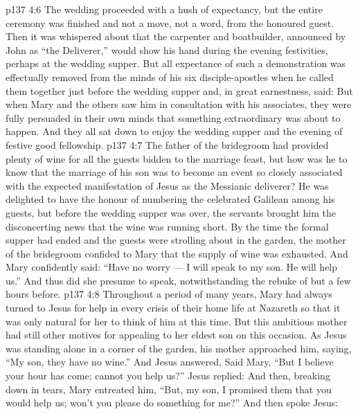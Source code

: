 \vs p137 4:6 \pc The wedding proceeded with a hush of expectancy, but the entire ceremony was finished and not a move, not a word, from the honoured guest. Then it was whispered about that the carpenter and boatbuilder, announced by John as “the Deliverer,” would show his hand during the evening festivities, perhaps at the wedding supper. But all expectance of such a demonstration was effectually removed from the minds of his six disciple\hyp{}apostles when he called them together just before the wedding supper and, in great earnestness, said:  But when Mary and the others saw him in consultation with his associates, they were fully persuaded in their own minds that something extraordinary was about to happen. And they all sat down to enjoy the wedding supper and the evening of festive good fellowship.
\vs p137 4:7 \pc The father of the bridegroom had provided plenty of wine for all the guests bidden to the marriage feast, but how was he to know that the marriage of his son was to become an event so closely associated with the expected manifestation of Jesus as the Messianic deliverer? He was delighted to have the honour of numbering the celebrated Galilean among his guests, but before the wedding supper was over, the servants brought him the disconcerting news that the wine was running short. By the time the formal supper had ended and the guests were strolling about in the garden, the mother of the bridegroom confided to Mary that the supply of wine was exhausted. And Mary confidently said: “Have no worry --- I will speak to my son. He will help us.” And thus did she presume to speak, notwithstanding the rebuke of but a few hours before.
\vs p137 4:8 Throughout a period of many years, Mary had always turned to Jesus for help in every crisis of their home life at Nazareth so that it was only natural for her to think of him at this time. But this ambitious mother had still other motives for appealing to her eldest son on this occasion. As Jesus was standing alone in a corner of the garden, his mother approached him, saying, “My son, they have no wine.” And Jesus answered,  Said Mary, “But I believe your hour has come; cannot you help us?” Jesus replied:  And then, breaking down in tears, Mary entreated him, “But, my son, I promised them that you would help us; won’t you please do something for me?” And then spoke Jesus: 
